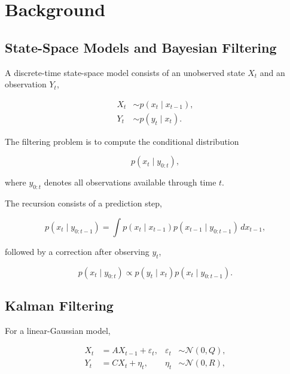 \section{Background}
\label{sec:background}

\subsection{State-Space Models and Bayesian Filtering}
\label{subsec:state-space-models}

A discrete-time state-space model consists of an unobserved state
\(X_t\) and an observation \(Y_t\),

\begin{align}
	X_t &\sim p(x_t\mid x_{t-1}), \\
	Y_t &\sim p(y_t\mid x_t).
\end{align}

The filtering problem is to compute the conditional distribution

\begin{equation}
	p(x_t\mid y_{0:t}),
\end{equation}

where \(y_{0:t}\) denotes all observations available through time \(t\).

The recursion consists of a prediction step,

\begin{equation}
	p(x_t\mid y_{0:t-1})
	=
	\int
	p(x_t\mid x_{t-1})
	p(x_{t-1}\mid y_{0:t-1})
	\,dx_{t-1},
\end{equation}

followed by a correction after observing \(y_t\),

\begin{equation}
	p(x_t\mid y_{0:t})
	\propto
	p(y_t\mid x_t)
	p(x_t\mid y_{0:t-1}).
\end{equation}


\subsection{Kalman Filtering}
\label{subsec:kalman-filter}

For a linear-Gaussian model,

\begin{align}
	X_t &= A X_{t-1} + \varepsilon_t,
	& \varepsilon_t &\sim \mathcal{N}(0,Q), \\
	Y_t &= C X_t + \eta_t,
	& \eta_t &\sim \mathcal{N}(0,R),
\end{align}


